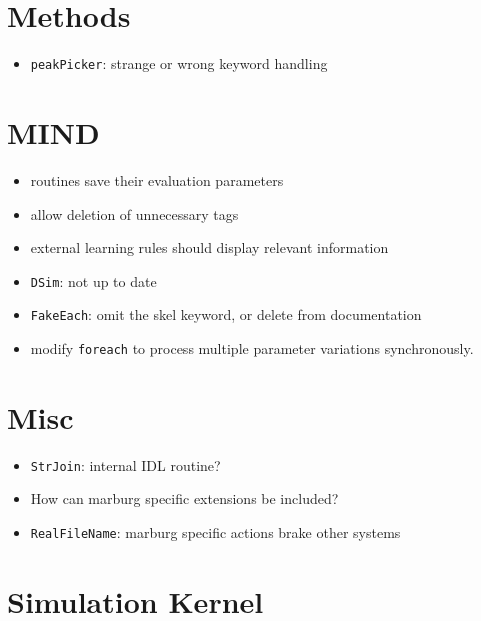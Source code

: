 \documentclass[12pt]{article}
\begin{document}
\section{Methods}
\begin{itemize}
\item \texttt{peakPicker}: strange or wrong keyword handling
\end{itemize}


\section{MIND}

\begin{itemize}
\item routines save their evaluation parameters 
\item allow deletion of unnecessary tags
\item external learning rules should display relevant information
\item \texttt{DSim}: not up to date
\item \texttt{FakeEach}: omit the skel keyword, or delete from documentation
\item modify \texttt{foreach} to process multiple parameter variations synchronously. 
\end{itemize}



\section{Misc}
\begin{itemize}
\item \texttt{StrJoin}: internal IDL routine?
\item How can marburg specific extensions be included?
\item \texttt{RealFileName}: marburg specific actions brake other systems
\end{itemize}




\section{Simulation Kernel}
\end{document}
